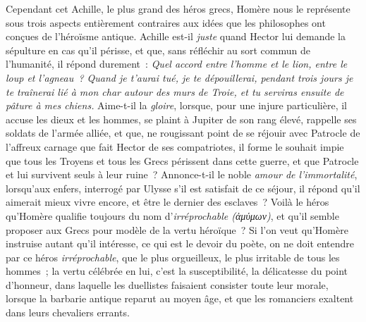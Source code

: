 \documentclass[french,twoside]{book} %
\begin{document}
Cependant cet Achille, le plus grand des héros grecs, Homère nous le représente sous trois aspects entièrement contraires aux idées que les philosophes ont conçues de l’héroïsme antique. Achille est-il {\itshape juste} quand Hector lui demande la sépulture en cas qu’il périsse, et que, sans réfléchir au sort commun de l’humanité, il répond durement : \emph{{\itshape Quel accord entre l’homme et le lion, entre le loup et l’agneau ? Quand je t’aurai tué, je te dépouillerai, pendant trois jours je te traînerai lié à mon char autour des murs de Troie, et tu serviras ensuite de pâture à mes chiens.}} Aime-t-il la {\itshape gloire}, lorsque, pour une injure particulière, il accuse les dieux et les hommes, se plaint à Jupiter de son rang élevé, rappelle ses soldats de l’armée alliée, et que, ne rougissant point de se réjouir avec Patrocle de l’affreux carnage que fait Hector de ses compatriotes, il forme le souhait impie que tous les Troyens et tous les Grecs périssent dans cette guerre, et que Patrocle et lui survivent seuls à leur ruine ? Annonce-t-il le noble {\itshape amour de l’immortalité}, lorsqu’aux  enfers, interrogé par Ulysse s’il est satisfait de ce séjour, il répond qu’il aimerait mieux vivre encore, et être le dernier des esclaves ? Voilà le héros qu’Homère qualifie toujours du nom d’\emph{{\itshape irréprochable} (ἀμύμων)}, et qu’il semble proposer aux Grecs pour modèle de la vertu héroïque ? Si l’on veut qu’Homère instruise autant qu’il intéresse, ce qui est le devoir du poète, on ne doit entendre par ce héros {\itshape irréprochable}, que le plus orgueilleux, le plus irritable de tous les hommes ; la vertu célébrée en lui, c’est la susceptibilité, la délicatesse du point d’honneur, dans laquelle les duellistes faisaient consister toute leur morale, lorsque la barbarie antique reparut au moyen âge, et que les romanciers exaltent dans leurs chevaliers errants.\par
\end{document}
